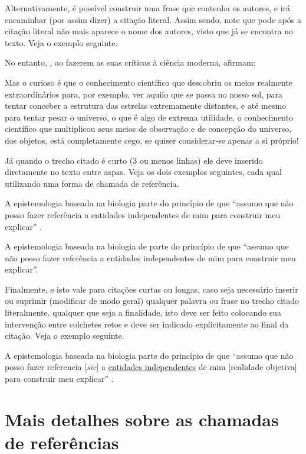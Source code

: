 \begin{apendicesenv}
Alternativamente, é possível construir uma frase que contenha os autores, e
irá encaminhar (por assim dizer) a citação literal. Assim sendo, note que pode
após a citação literal não mais aparece o nome dos autores, visto que já se
encontra no texto. Veja o exemplo seguinte.

No entanto, , ao fazerem as suas críticas à ciência
moderna, afirmam:

\begin{citacao}
    Mas o curioso é que o conhecimento científico que descobriu os meios
    realmente extraordinários para, por exemplo, ver aquilo que se passa no
    nosso sol, para tentar conceber a estrutura das estrelas extremamente
    distantes, e até mesmo para tentar pesar o universo, o que é algo de extrema
    utilidade, o conhecimento científico que multiplicou seus meios de
    observação e de concepção do universo, dos objetos, está completamente cego,
    se quiser considerar-se apenas a si próprio!
\end{citacao}

Já quando o trecho citado é curto (3 ou menos linhas) ele deve inserido
diretamente no texto entre aspas. Veja os dois exemplos seguintes, cada qual
utilizando uma forma de chamada de referência.

A epistemologia baseada na biologia parte do princípio de que ``assumo que não
posso fazer referência a entidades independentes de mim para construir meu
explicar'' \cite[p.~35]{Maturana2003}.

A epistemologia baseada na biologia de  parte
do princípio de que ``assumo que não posso fazer referência a entidades
independentes de mim para construir meu explicar''.

Finalmente, e isto vale para citações curtas ou longas, caso seja necessário
inserir ou suprimir (modificar de modo geral) qualquer palavra ou frase no
trecho citado literalmente, qualquer que seja a finalidade, isto deve ser feito
colocando sua intervenção entre colchetes retos e deve ser indicado
explicitamente ao final da citação. Veja o exemplo seguinte.

A epistemologia baseada na biologia parte do princípio de que ``assumo que não
posso fazer referencia [\textit{sic}] a \underline{entidades independentes} de
mim [realidade objetiva] para construir meu explicar'' \cite[p.~35, comentários
e grifo nosso]{Maturana2003}.

\section{Mais detalhes sobre as chamadas de referências}
\label{sec:referUtilizadas}


\end{apendicesenv}
